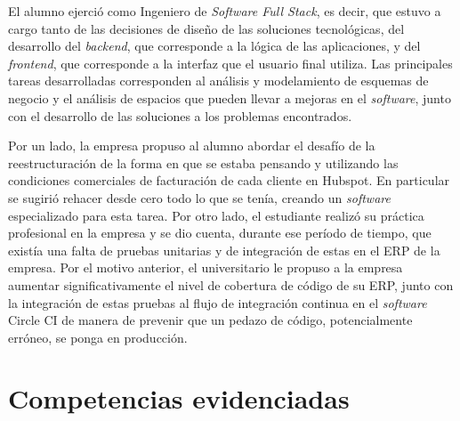     El alumno ejerció como Ingeniero de \textit{Software Full Stack}, es decir, que estuvo a cargo tanto de las decisiones de diseño de las soluciones tecnológicas, del desarrollo del \textit{backend}, que corresponde a la lógica de las aplicaciones, y del \textit{frontend}, que corresponde a la interfaz que el usuario final utiliza. Las principales tareas desarrolladas corresponden al análisis y modelamiento de esquemas de negocio y el análisis de espacios que pueden llevar a mejoras en el \textit{software}, junto con el desarrollo de las soluciones a los problemas encontrados.
    
    Por un lado, la empresa propuso al alumno abordar el desafío de la reestructuración de la forma en que se estaba pensando y utilizando las condiciones comerciales de facturación de cada cliente en Hubspot. En particular se sugirió rehacer desde cero todo lo que se tenía, creando un \textit{software} especializado para esta tarea. Por otro lado, el estudiante realizó su práctica profesional en la empresa y se dio cuenta, durante ese período de tiempo, que existía una falta de pruebas unitarias y de integración de estas en el ERP de la empresa. Por el motivo anterior, el universitario le propuso a la empresa aumentar significativamente el nivel de cobertura de código de su ERP, junto con la integración de estas pruebas al flujo de integración continua en el \textit{software} Circle CI de manera de prevenir que un pedazo de código, potencialmente erróneo, se ponga en producción.



\section{Competencias evidenciadas}
    \label{competencias}


